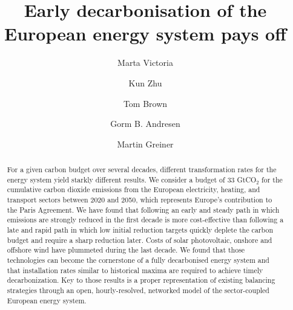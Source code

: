 \documentclass[5p]{elsarticle} %
\begin{document}
\begin{frontmatter}

\title{Early decarbonisation of the European energy system pays off}
\author[mymainaddress,iClimate]{Marta Victoria}
\author[mymainaddress]{Kun Zhu}
\author[kitaddress]{Tom Brown}
\author[mymainaddress,iClimate]{Gorm B. Andresen}
\author[mymainaddress,iClimate]{Martin Greiner}
\address[mymainaddress]{Department of Engineering, Aarhus University, Inge Lehmanns Gade 10, 8000 Aarhus, Denmark}
\address[iClimate]{iCLIMATE Interdisciplinary Centre for Climate Change, Aarhus University}
\address[kitaddress]{Institute for Automation and Applied Informatics (IAI), Karlsruhe Institute of Technology (KIT), Forschungszentrum 449, 76344, Eggenstein-Leopoldshafen, Germany}


\begin{abstract}

For a given carbon budget over several decades, different transformation rates for the energy system yield starkly different results. We consider a budget of 33 GtCO$_2$ for the cumulative carbon dioxide emissions from the European electricity, heating, and transport sectors between 2020 and 2050, which represents Europe's contribution to the Paris Agreement. We have found that following an early and steady path in which emissions are strongly reduced in the first decade is more cost-effective than following a late and rapid path in which low initial reduction targets quickly deplete the carbon budget and require a sharp reduction later. Costs of solar photovoltaic, onshore and offshore wind have plummeted during the last decade. We found that those technologies can become the cornerstone of a fully decarbonised energy system and that installation rates similar to historical maxima are required to achieve timely decarbonization. Key to those results is a proper representation of existing balancing strategies through an open, hourly-resolved, networked model of the sector-coupled European energy system.



\end{abstract}
\end{frontmatter}
\end{document}
